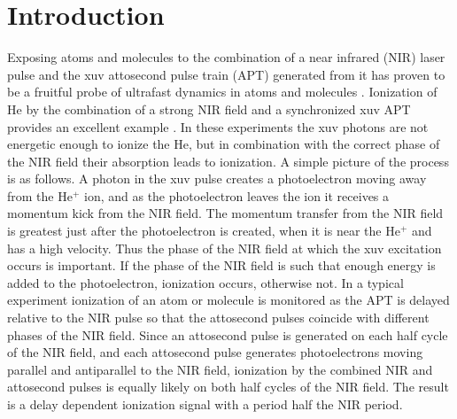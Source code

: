\documentclass[aps,pra,preprint,groupedaddress]{revtex4-1}
\begin{document}

\section{\label{sec:intro}Introduction}



Exposing atoms and molecules to the combination of a near infrared (NIR) laser pulse and the xuv attosecond pulse train (APT) generated from it has proven to be a fruitful probe of ultrafast dynamics in atoms and molecules \cite{Krausz}. Ionization of He by the combination of a strong NIR field and a synchronized xuv APT provides an excellent example \cite{Johnsson, Ranitovic, Tong}.  In these experiments the xuv photons are not energetic enough to ionize the He, but in combination with the correct phase of the NIR field their absorption leads to ionization. A simple picture of the process is as follows. A photon in the xuv pulse creates a photoelectron moving away from the He$^+$ ion, and as the photoelectron leaves the ion it receives a momentum kick from the NIR field. The momentum transfer from the NIR field is greatest just after the photoelectron is created, when it is near the He$^+$ and has a high velocity. Thus the phase of the NIR field at which the xuv excitation occurs is important. If the phase of the NIR field is such that enough energy is added to the photoelectron, ionization occurs, otherwise not. In a typical experiment ionization of an atom or molecule is monitored as the APT is delayed relative to the NIR pulse so that the attosecond pulses coincide with different phases of the NIR field. Since an attosecond  pulse is generated on each half cycle of the NIR field, and each attosecond pulse generates photoelectrons moving parallel and antiparallel to the NIR field, ionization by the combined NIR and attosecond pulses is equally likely on both half cycles of the NIR field. The result is a delay dependent ionization signal with a period half the NIR period.
\end{document}
